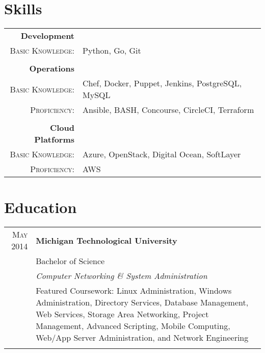 \documentclass[a4paper,9pt]{extarticle}
\begin{document}
\section{Skills}
\begin{tabular}{rl}
 \textbf{Development}&\\\textsc{Basic Knowledge:}&\footnotesize{Python, Go, Git}\\\multicolumn{2}{c}{}\\
 \textbf{Operations}&\\\textsc{Basic Knowledge:}&\footnotesize{Chef, Docker, Puppet, Jenkins, PostgreSQL, MySQL}\\\textsc{Proficiency:}&\footnotesize{Ansible, BASH, Concourse, CircleCI, Terraform}\\\multicolumn{2}{c}{}\\
 \textbf{Cloud Platforms}&\\\textsc{Basic Knowledge:}&\footnotesize{Azure, OpenStack, Digital Ocean, SoftLayer}\\\textsc{Proficiency:}&\footnotesize{AWS}
\end{tabular}

\section{Education}
\begin{tabular}{rp{8.5cm}}
 \textsc{May 2014}&\textbf{Michigan Technological University}\\&Bachelor of Science\\&\emph{Computer Networking \& System Administration}\\&\footnotesize{Featured Coursework: Linux Administration, Windows Administration, Directory Services, Database Management, Web Services, Storage Area Networking, Project Management, Advanced Scripting, Mobile Computing, Web/App Server Administration, and Network Engineering}\\\multicolumn{2}{c}{}\\
\end{tabular}
\end{document}
